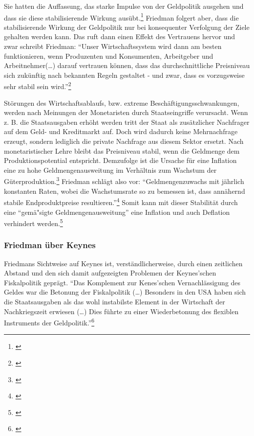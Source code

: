 \documentclass[
        onecolumn,
        a4paper,
        abstracton,
        parskip=half
        ,final
        ]{scrartcl}
\begin{document}
Sie hatten die Auffassung, das starke Impulse von der Geldpolitik ausgehen und
dass sie diese stabilisierende Wirkung aus{\"u}bt.\footnote[82]{\citep*[S.181]{bombach1981theorie}}
Friedman folgert aber, dass die stabilisierende Wirkung der Geldpolitik nur bei konsequenter Verfolgung der Ziele gehalten werden kann. Das ruft dann einen Effekt des Vertrauens
hervor und zwar schreibt Friedman: "`Unser Wirtschaftssystem wird dann am
besten funktionieren, wenn Produzenten und Konsumenten, Arbeitgeber und
Arbeitnehmer(\ldots) darauf vertrauen k{\"o}nnen, dass das durchschnittliche
Preisniveau sich zuk{\"u}nftig nach bekannten Regeln gestaltet - und zwar, dass
es vorzugsweise sehr stabil sein wird."'\footnote[83]{\citep*[vgl.][S.150]{friedman1970die}}

St{\"o}rungen des Wirtschaftsablaufs, bzw. extreme Besch{\"a}ftigungsschwankungen, werden nach Meinungen der Monetaristen durch Staatseingriffe verursacht. Wenn z. B. die Staatsausgaben erh{\"o}ht werden tritt der Staat als zus{\"a}tzlicher Nachfrager auf dem Geld- und Kreditmarkt auf. Doch wird dadurch keine Mehrnachfrage erzeugt, sondern lediglich die private Nachfrage aus diesem Sektor ersetzt. Nach monetaristischer Lehre bleibt das Preisniveau stabil, wenn die Geldmenge dem Produktionspotential entspricht. Demzufolge ist die Ursache f{\"u}r eine Inflation eine zu hohe Geldmengenausweitung im Verh{\"a}ltnis zum Wachstum der G{\"u}terproduktion.\footnote[84]{\citep*[vgl.][S.213]{peters2000}}
Friedman schl{\"a}gt also vor: "`Geldmengenzuwachs mit j{\"a}hrlich konstanten Raten, wobei die Wachstumsrate so zu bemessen ist, dass ann{\"a}hernd stabile Endproduktpreise resultieren."'\footnote[85]{\citep*[vgl.][S.132]{friedman1970die}} Somit kann mit dieser
Stabilit{\"a}t durch eine "`gem{\"a}{"s}igte Geldmengenausweitung"' eine Inflation und auch
Deflation verhindert werden.\footnote[86]{\citep*[vgl.][S.155]{friedman1970die}}

\subsubsection{Friedman {\"u}ber Keynes} %
Friedmans Sichtweise auf Keynes ist, verst{\"a}ndlicherweise, durch einen zeitlichen Abstand und den sich damit aufgezeigten Problemen der Keynes'schen Fiskalpolitik gepr{\"a}gt. "`Das Komplement zur Kenes'schen Vernachl{\"a}ssigung des Geldes war die Betonung der
Fiskalpolitik (\ldots) Besonders in den USA haben sich die Staatsausgaben als das wohl instabilste Element in der Wirtschaft der Nachkriegszeit erwiesen (\ldots) Dies f{\"u}hrte zu einer Wiederbetonung des flexiblen Instruments der Geldpolitik."'\footnote[87]{\citep*[S.105]{friedman1970die}}
\end{document}
